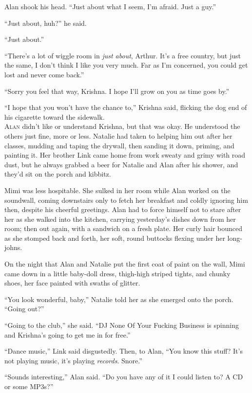 \documentclass{article}
\begin{document}
Alan shook his head.  ``Just about what I seem, I'm afraid.  Just a
guy.''

``Just about, huh?'' he said.

``Just about.''

``There's a lot of wiggle room in \textit{just about}, Arthur.  It's a
free country, but just the same, I don't think I like you very much. 
Far as I'm concerned, you could get lost and never come back.''

``Sorry you feel that way, Krishna.  I hope I'll grow on you as time
goes by.''

``I hope that you won't have the chance to,'' Krishna said, flicking
the dog end of his cigarette toward the sidewalk.
\\
\lettrine[lines=3, lhang=.5, nindent=0pt, findent=2pt]{A}{lan} didn't like or understand Krishna, but that was okay.  He
understood the others just fine, more or less.  Natalie had taken to
helping him out after her classes, mudding and taping the drywall,
then sanding it down, priming, and painting it.  Her brother Link came
home from work sweaty and grimy with road dust, but he always grabbed
a beer for Natalie and Alan after his shower, and they'd sit on the
porch and kibbitz.

Mimi was less hospitable.  She sulked in her room while Alan worked on
the soundwall, coming downstairs only to fetch her breakfast and
coldly ignoring him then, despite his cheerful greetings.  Alan had to
force himself not to stare after her as she walked into the kitchen,
carrying yesterday's dishes down from her room; then out again, with a
sandwich on a fresh plate.  Her curly hair bounced as she stomped back
and forth, her soft, round buttocks flexing under her long-johns.

On the night that Alan and Natalie put the first coat of paint on the
wall, Mimi came down in a little baby-doll dress, thigh-high striped
tights, and chunky shoes, her face painted with swaths of glitter.

``You look wonderful, baby,'' Natalie told her as she emerged onto the
porch.  ``Going out?''

``Going to the club,'' she said.  ``DJ None Of Your Fucking Business
is spinning and Krishna's going to get me in for free.''

``Dance music,'' Link said disgustedly.  Then, to Alan, ``You know
this stuff?  It's not playing music, it's playing \textit{records}. 
Snore.''

``Sounds interesting,'' Alan said.  ``Do you have any of it I could
listen to?  A CD or some MP3s?''
\end{document}
